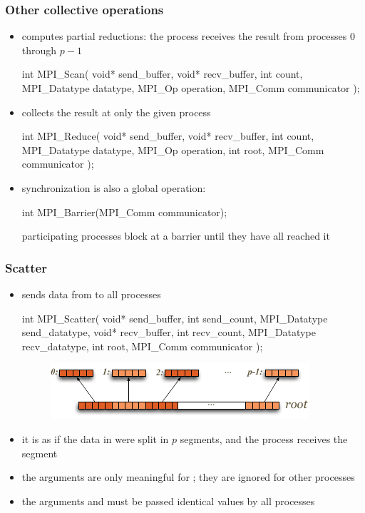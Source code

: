 \begin{frame}[fragile]
%
  \frametitle{Other collective operations}
%
  \begin{itemize}
%
  \item {} computes partial reductions: the  process receives the
    result from processes 0 through $p-1$
    \begin{C}
int MPI_Scan(
        void* send_buffer, void* recv_buffer,
        int count, MPI_Datatype datatype, MPI_Op operation,
        MPI_Comm communicator
        );
   \end{C}
%
  \item {} collects the result at only the given process 
    \begin{C}
int MPI_Reduce(
        void* send_buffer, void* recv_buffer,
        int count, MPI_Datatype datatype, MPI_Op operation,
        int root, MPI_Comm communicator
        );
   \end{C}
%
   \item synchronization is also a global operation:
    \begin{C}
int MPI_Barrier(MPI_Comm communicator);
   \end{C}
%
   participating processes block at a barrier until they have all reached it
%
  \end{itemize}
%
\end{frame}

\begin{frame}[fragile]
%
  \frametitle{Scatter}
%
  \begin{itemize}
%
  \item {} sends data from  to all processes 
    \begin{C}
int MPI_Scatter(
        void* send_buffer, int send_count, MPI_Datatype send_datatype,
        void* recv_buffer, int recv_count, MPI_Datatype recv_datatype,
        int root, MPI_Comm communicator
        );
    \end{C}
    \begin{figure}
      \centering
      \includegraphics[scale=1.0]{figures/mpi-scatter.pdf}
    \end{figure}
%
  \item it is as if the data in  were split in $p$ segments, and the
     process receives the  segment
%
  \item the  arguments are only meaningful for ; they
    are ignored for other processes
%
  \item the arguments  and  must be passed identical
    values by all processes
%
  \end{itemize}
% 
\end{frame}

